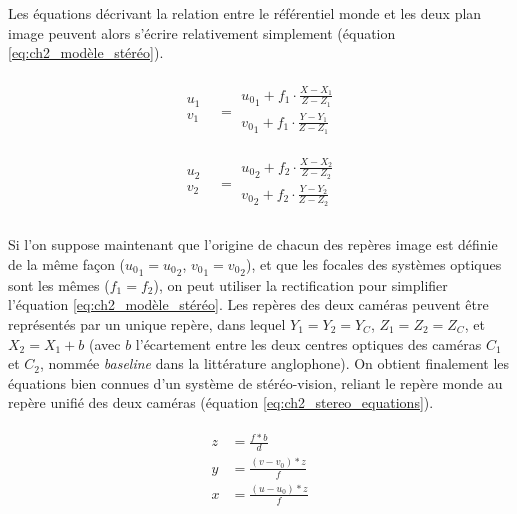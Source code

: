 Les équations décrivant la relation entre le référentiel \og monde\fg{} et les deux plan image peuvent alors s'écrire relativement simplement (équation \ref{eq:ch2_modèle_stéréo}).

\begin{align} \label{eq:ch2_modèle_stéréo} 
	\begin{split}
		\begin{array}{|c}
		u_1\\
		v_1\\
		\end{array}	
		&=
		\begin{array}{|c}
		{u_0}_1 + f_1 \cdot \frac{X - X_1}{Z - Z_1}\\
		{v_0}_1 + f_1 \cdot \frac{Y - Y_1}{Z - Z_1}\\
		\end{array}	\\ \\
		\begin{array}{|c}
			u_2\\
			v_2\\
		\end{array}
		&= 
		\begin{array}{|c}
			{u_0}_2 + f_2 \cdot \frac{X - X_2}{Z - Z_2}\\
			{v_0}_2 + f_2 \cdot \frac{Y - Y_2}{Z - Z_2}\\
		\end{array}
	\end{split}
\end{align}

Si l'on suppose maintenant que l'origine de chacun des repères image est définie de la même façon (${u_0}_1 = {u_0}_2$, ${v_0}_1 = {v_0}_2$), et que les focales des systèmes optiques sont les mêmes ($f_1 = f_2$), on peut utiliser la rectification pour simplifier l'équation \ref{eq:ch2_modèle_stéréo}. Les repères des deux caméras peuvent être représentés par un unique repère, dans lequel $Y_1 = Y_2 = Y_C$, $Z_1 = Z_2 = Z_C$, et $X_2 = X_1 + b$ (avec $b$ l'écartement entre les deux centres optiques des caméras $C_1$ et $C_2$, nommée \textit{baseline} dans la littérature anglophone). On obtient finalement les équations bien connues d'un système de stéréo-vision, reliant le repère monde au repère unifié des deux caméras (équation \ref{eq:ch2_stereo_equations}).

\begin{align} \label{eq:ch2_stereo_equations}
	\begin{split}
		z& = \frac{f * b}{d}	\\
		y& = \frac{(v - v_0) * z} {f}	\\
		x& = \frac{(u - u_0) * z} {f}
	\end{split}
\end{align}

